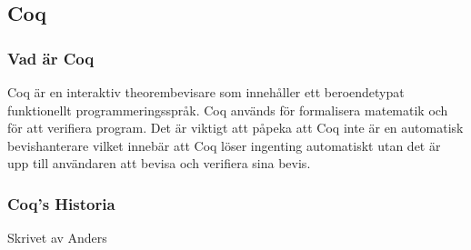 \subsection{Coq}
\subsubsection{Vad är Coq}
Coq är en interaktiv theorembevisare som innehåller ett beroendetypat
funktionellt programmeringsspråk. Coq används för formalisera matematik och för
att verifiera program. Det är viktigt att påpeka att Coq inte är en automatisk
bevishanterare vilket innebär att Coq löser ingenting automatiskt utan det är
upp till användaren att bevisa och verifiera sina bevis.

\subsubsection{Coq's Historia}
Skrivet av Anders

